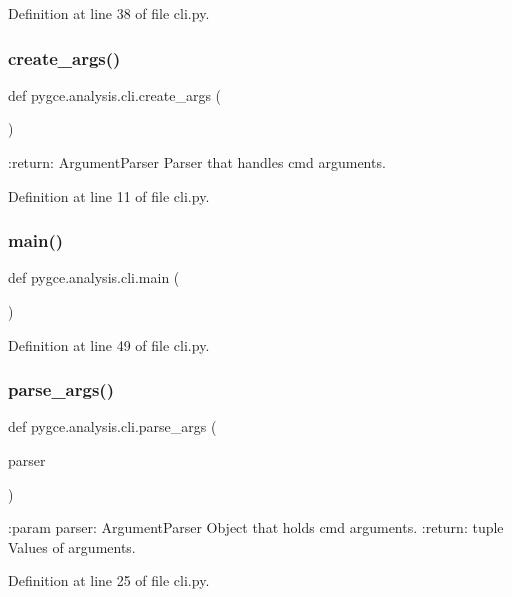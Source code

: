 Definition at line 38 of file cli.\+py.

\mbox{\label{namespacepygce_1_1analysis_1_1cli_a419c1db8bd8fc26d5b81a3ca27fe79d4}} 
\subsubsection{\texorpdfstring{create\+\_\+args()}{create\_args()}}
{\footnotesize\ttfamily def pygce.\+analysis.\+cli.\+create\+\_\+args (\begin{DoxyParamCaption}{ }\end{DoxyParamCaption})}

\begin{DoxyVerb}:return: ArgumentParser
    Parser that handles cmd arguments.
\end{DoxyVerb}
 

Definition at line 11 of file cli.\+py.

\mbox{\label{namespacepygce_1_1analysis_1_1cli_a172ae5d6f63e3600d4b184c6e23cd375}} 
\subsubsection{\texorpdfstring{main()}{main()}}
{\footnotesize\ttfamily def pygce.\+analysis.\+cli.\+main (\begin{DoxyParamCaption}{ }\end{DoxyParamCaption})}



Definition at line 49 of file cli.\+py.

\mbox{\label{namespacepygce_1_1analysis_1_1cli_ac516ecec64d1d3b73eef12d5114ae9c5}} 
\subsubsection{\texorpdfstring{parse\+\_\+args()}{parse\_args()}}
{\footnotesize\ttfamily def pygce.\+analysis.\+cli.\+parse\+\_\+args (\begin{DoxyParamCaption}\item[{}]{parser }\end{DoxyParamCaption})}

\begin{DoxyVerb}:param parser: ArgumentParser
    Object that holds cmd arguments.
:return: tuple
    Values of arguments.
\end{DoxyVerb}
 

Definition at line 25 of file cli.\+py.

